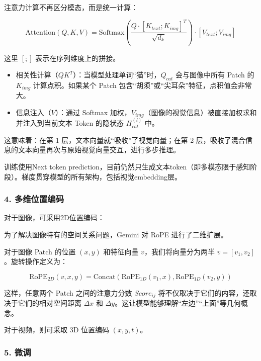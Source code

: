 注意力计算不再区分模态，而是统一计算：

\[
\mathrm{Attention}(Q,K,V)=\mathrm{Softmax}\left(\frac{Q\cdot [K_{text};K_{img}]^T}{\sqrt{d_k}}\right)\cdot [V_{text};V_{img}]
\]

这里 \([;]\) 表示在序列维度上的拼接。

\begin{itemize}
\tightlist
\item
  相关性计算（\(QK^T\)）：当模型处理单词``猫''时，\(Q_{cat}\) 会与图像中所有 Patch 的 \(K_{img}\) 计算点积。如果某个 Patch 包含``胡须''或``尖耳朵''特征，点积值会非常大。
\item
  信息注入（\(V\)）：通过 Softmax 加权，\(V_{img}\)（图像的视觉信息）被直接加权求和并注入到当前文本 Token 的隐状态 \(H_{cat}^{(l)}\) 中。
\end{itemize}

这意味着：在第 1 层，文本向量就``吸收''了视觉向量；在第 2 层，吸收了混合信息的文本向量再次与原始视觉向量交互，进行多步推理。

训练使用Next token prediction，目前仍然只生成文本token（即多模态限于感知阶段）。梯度贯穿模型的所有架构，包括视觉embedding层。

\hypertarget{ux591aux7ef4ux4f4dux7f6eux7f16ux7801}{%
\subsubsection{4. 多维位置编码}\label{ux591aux7ef4ux4f4dux7f6eux7f16ux7801}}

对于图像，可采用2D位置编码：

为了解决图像特有的空间关系问题，Gemini 对 RoPE 进行了二维扩展。

对于图像 Patch 的位置 \((x,y)\) 和特征向量 \(v\)，我们将向量分为两半 \(v=[v_1,v_2]\)。旋转操作定义为：

\[
\mathrm{RoPE}_{2D}(v,x,y)=\mathrm{Concat}(\mathrm{RoPE}_{1D}(v_1,x),\mathrm{RoPE}_{1D}(v_2,y))
\]

这样，任意两个 Patch 之间的注意力分数 \(Score_{ij}\) 将不仅取决于它们的内容，还取决于它们的相对空间距离 \(\Delta x\) 和 \(\Delta y\)。这让模型能够理解``左边''``上面''等几何概念。

对于视频，则可采取 3D 位置编码 \((x,y,t)\)。

\hypertarget{ux5faeux8c03}{%
\subsubsection{5. 微调}\label{ux5faeux8c03}}

